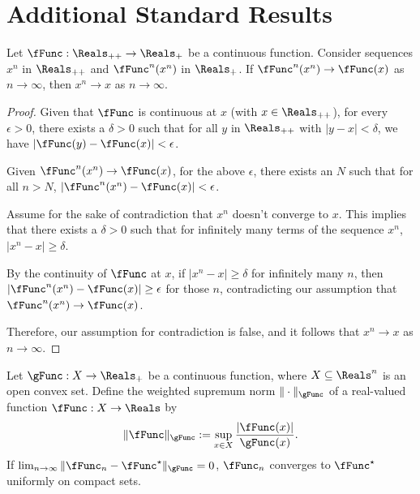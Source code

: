 \documentclass[\econtexRoot/BufferStockTheory]{subfiles}
\begin{document}
\section{Additional Standard Results}\label{sec:realanalysis}


\begin{proposition}
Let $\fFunc: \Reals_{++} \to \Reals_{+}$ be a continuous function. Consider sequences $x^{n}$ in $\Reals_{++}$ and $\fFunc^n(x^{n})$ in $\Reals_{+}$. If $\fFunc^{n}(x^{n}) \to \fFunc(x)$ as $n \to \infty$, then $x^{n} \to x$ as $n \to \infty$.
\end{proposition}

\begin{proof}
Given that $\fFunc$ is continuous at $x$ (with $x \in \Reals_{++}$), for every $\epsilon > 0$, there exists a $\delta > 0$ such that for all $y$ in $\Reals_{++}$ with $\vert y - x\vert < \delta$, we have $\vert \fFunc(y) - \fFunc(x)\vert  < \epsilon$.

Given $\fFunc^{n}(x^{n}) \to \fFunc(x)$, for the above $\epsilon$, there exists an $N$ such that for all $n > N$, $\vert \fFunc^{n}(x^{n}) - \fFunc(x)\vert < \epsilon$.

Assume for the sake of contradiction that $x^{n}$ doesn't converge to $x$.
This implies that there exists a $\delta > 0$ such that for infinitely many terms of the sequence $x^{n}$, $\vert x^{n} - x\vert  \geq \delta$.

By the continuity of $\fFunc$ at $x$, if $\vert x^{n} - x\vert  \geq \delta$ for infinitely many $n$, then $\vert \fFunc^{n}(x^{n}) - \fFunc(x)\vert  \geq \epsilon$ for those $n$, contradicting our assumption that $\fFunc^{n}(x^{n}) \to \fFunc(x)$.

Therefore, our assumption for contradiction is false, and it follows that $x^{n} \to x$ as $n \to \infty$.
\end{proof}

\begin{fact}\label{fact:normimpliescompact}
Let $\gFunc: X \to \Reals_{+}$ be a continuous function, where $X \subseteq \Reals^{n}$ is an open convex set.
Define the weighted supremum norm $\Vert\cdot \Vert_{\gFunc}$ of a real-valued function $\fFunc: X \to \Reals$ by
\begin{equation}
\Vert \fFunc \Vert_\gFunc := \sup_{x \in X} \frac{\vert \fFunc(x)\vert }{\gFunc(x)}.
\end{equation}
If $\lim_{n \to \infty} \Vert \fFunc_n - \fFunc^{\star} \Vert_\gFunc = 0$, $\fFunc_n$ converges to $\fFunc^{\star}$ uniformly on compact sets.
\end{fact}
\end{document}
